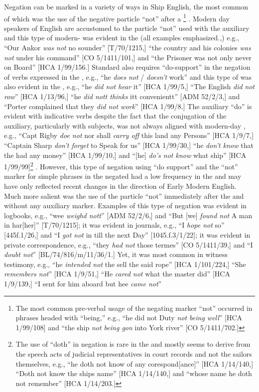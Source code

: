   Negation can be marked in a variety of ways in Ship English, the most common of which was the use of the negative particle “not” after a \footnote{The most common pre-verbal usage of the negating marker “not” occurred in phrases headed with “being,” e.g., “he did not Duty \textit{not being well}” [HCA 1/99/108] and “the  ship \textit{not being gon} into York river” [CO 5/1411/702.]} . Modern day speakers of English are accustomed to the particle “not” used with the auxiliary  and this type of modern- was evident in the  (all examples emphasized.,) e.g., “Our Ankor \textit{was not} no sounder” [T/70/1215,] “the country and his colonies \textit{was not} under his command” [CO 5/1411/101,] and “the Prisoner was not only never on Board” [HCA 1/99/156.] Standard  also requires “do-support” in the negation of verbs expressed in the  , e.g., “he \textit{does not} / \textit{doesn’t} work” and this type of  was also evident in the , e.g., “he \textit{did not hear} it” [HCA 1/99/5,] “The English \textit{did not row}” [HCA 1/13/96,] “he \textit{did nott thinks} itt convenientt” [ADM 52/2/3,] and “Porter complained that they \textit{did not work}” [HCA 1/99/8.] The auxiliary “do” is evident with indicative verbs despite the fact that the conjugation of the auxiliary, particularly with  subjects, was not always aligned with modern-day , e.g., “Capt Rigby \textit{doe not} nor shall \textit{carry off} this land any Persons” [HCA 1/9/7,] “Captain Sharp \textit{don’t forget} to Speak for us” [HCA 1/99/30,] “he \textit{don’t know} that the  had any money” [HCA 1/99/10,] and “[he] \textit{do’s not know} what ship” [HCA 1/99/99]\footnote{The use of “doth” in negation is rare in the  and mostly seems to derive from the speech acts of judicial representatives in court records and not the sailors themselves, e.g., “he doth not know of any corespond[ance]” [HCA 1/14/140,] “Doth not know the ships name” [HCA 1/14/140,] and “whose name he doth not remember” [HCA 1/14/203.]} . However, this type of negation using “do support” and the “not” marker for simple  phrases in the negated  had a low frequency in the  and may have only reflected recent changes in the direction of Early Modern English. Much more salient was the use of the particle “not” immediately after the  and without any auxiliary marker. Examples of this type of negation was evident in logbooks, e.g., “wee \textit{weighd nott}” [ADM 52/2/6,] and “But [we] \textit{found not} A man in har[her]” [T/70/1215]; it was evident in journals, e.g., “I \textit{hope not} so” [445f.1/26,] and “I \textit{got not} in till the next Day” [1045.f.3/1/22]; it was evident in private correspondence, e.g., “they \textit{had not} those termes” [CO 5/1411/39,] and “I \textit{doubt not}” [BL/74/816/m/11/36/1.] Yet, it was most common in witness testimony, e.g., “he \textit{intended not} the sell the said rope” [HCA 1/101/224,] “She \textit{remembers not}” [HCA 1/9/51,] “He \textit{cared not} what the master did” [HCA 1/9/139,] “I sent for him aboard but hee \textit{came not}” 